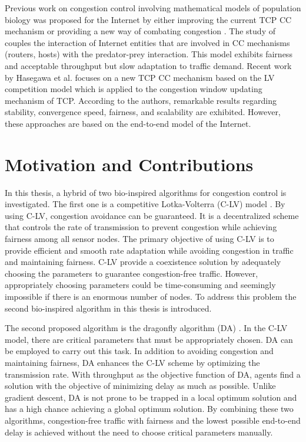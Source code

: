 Previous work on congestion control involving mathematical models of population biology was proposed for the Internet by either improving the current TCP CC mechanism \cite{Analoui:2006:CFB:1315843.1315889} or providing a new way of combating congestion \cite{Hasegawa:2006:TSC:1190326.1190338}. The study of \cite{Analoui:2006:CFB:1315843.1315889} couples the interaction of Internet entities that are involved in CC mechanisms (routers, hosts) with the predator-prey interaction. This model exhibits fairness and acceptable throughput but slow adaptation to traffic demand. Recent work by Hasegawa et al. \cite{Hasegawa:2006:TSC:1190326.1190338} focuses on a new TCP CC mechanism based on the LV competition model which is applied to the congestion window updating mechanism of TCP. According to the authors, remarkable results regarding stability, convergence speed, fairness, and scalability are exhibited. However, these approaches are based on the end-to-end model of the Internet.

\section{Motivation and Contributions}

In this thesis, a hybrid of two bio-inspired algorithms for congestion control is investigated. The first one is a competitive Lotka-Volterra (C-LV) model \cite{pop00001, NGUYEN20171192}. By using C-LV, congestion avoidance can be guaranteed. It is a decentralized scheme that controls the rate of transmission to prevent congestion while achieving fairness among all sensor nodes. The primary objective of using C-LV is to provide efficient and smooth rate adaptation while avoiding congestion in traffic and maintaining fairness. C-LV provide a coexistence solution by adequately choosing the parameters to guarantee congestion-free traffic. However, appropriately choosing parameters could be time-consuming and seemingly impossible if there is an enormous number of nodes. To address this problem the second bio-inspired algorithm in this thesis is introduced.

The second proposed algorithm is the dragonfly algorithm (DA) \cite{Mirjalili2016}. In the C-LV model, there are critical parameters that must be appropriately chosen. DA can be employed to carry out this task. In addition to avoiding congestion and maintaining fairness, DA enhances the C-LV scheme by optimizing the transmission rate. With throughput as the objective function of DA, agents find a solution with the objective of minimizing delay as much as possible. Unlike gradient descent, DA is not prone to be trapped in a local optimum solution and has a high chance achieving a global optimum solution. By combining these two algorithms, congestion-free traffic with fairness and the lowest possible end-to-end delay is achieved without the need to choose critical parameters manually. 

